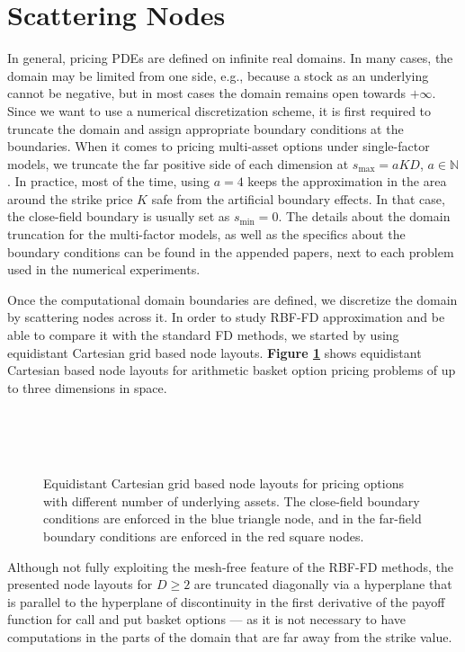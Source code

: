 \documentclass{UUThesisTemplate}
\begin{document}
\section{Scattering Nodes}
In general, pricing PDEs are defined on infinite real domains. In many cases, the domain may be limited from one side, e.g., because a stock as an underlying cannot be negative, but in most cases the domain remains open towards $+\infty$. Since we want to use a numerical discretization scheme, it is first required to truncate the domain and assign appropriate boundary conditions at the boundaries. When it comes to pricing multi-asset options under single-factor models, we truncate the far positive side of each dimension at $s_{\max}=aKD$, $a\in\mathbb{N}$. In practice, most of the time, using $a=4$ keeps the approximation in the area around the strike price $K$ safe from the artificial boundary effects. In that case, the close-field boundary is usually set as $s_{\min}=0$. The details about the domain truncation for the multi-factor models, as well as the specifics about the boundary conditions can be found in the appended papers, next to each problem used in the numerical experiments.
\par Once the computational domain boundaries are defined, we discretize the domain by scattering nodes across it. In order to study RBF-FD approximation and be able to compare it with the standard FD methods, we started by using equidistant Cartesian grid based node layouts. \textbf{Figure \ref{fig:gridreg}} shows equidistant Cartesian based node layouts for arithmetic basket option pricing problems of up to three dimensions in space.  
\begin{figure}[H]
\centering
\\
\vspace{11pt}
\\
\vspace{11pt}
\\
\caption{Equidistant Cartesian grid based node layouts for pricing options with different number of underlying assets. The close-field boundary conditions are enforced in the blue triangle node, and in the far-field boundary conditions are enforced in the red square nodes.}
\label{fig:gridreg}
\end{figure}
Although not fully exploiting the mesh-free feature of the RBF-FD methods, the presented node layouts for $D\geq2$ are truncated diagonally via a hyperplane that is parallel to the hyperplane of discontinuity in the first derivative of the payoff function for call and put basket options --- as it is not necessary to have computations in the parts of the domain that are far away from the strike value.  
\end{document}
